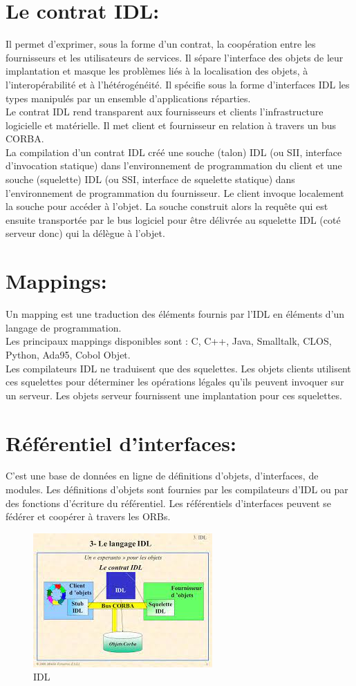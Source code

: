 \section{Le contrat IDL:}
Il permet d'exprimer, sous la forme d'un contrat, la coopération entre les fournisseurs et les utilisateurs de services. Il sépare l'interface des objets de leur implantation et masque les problèmes liés à la localisation des objets, à l'interopérabilité et à l'hétérogénéité. Il spécifie sous la forme d'interfaces IDL les types manipulés par un ensemble d'applications réparties.\\
Le contrat IDL rend transparent aux fournisseurs et clients l'infrastructure logicielle et matérielle. Il met client et fournisseur en relation à travers un bus CORBA.\\
La compilation d'un contrat IDL créé une souche (talon) IDL (ou SII, interface d'invocation statique) dans l'environnement de programmation du client et une souche (squelette) IDL (ou SSI, interface de squelette statique) dans l'environnement de programmation du fournisseur.
Le client invoque localement la souche pour accéder à l'objet. La souche construit alors la requête qui est ensuite transportée par le bus logiciel pour être délivrée au squelette IDL (coté serveur donc) qui la délègue à l'objet.\\

\section{Mappings:}
Un mapping est une traduction des éléments fournis par l'IDL en éléments d'un langage de programmation.\\
Les principaux mappings disponibles sont : C, C++, Java, Smalltalk, CLOS, Python, Ada95, Cobol Objet.\\
Les compilateurs IDL ne traduisent que des squelettes. Les objets clients utilisent ces squelettes pour déterminer les opérations légales qu'ils peuvent invoquer sur un serveur. Les objets serveur fournissent une implantation pour ces squelettes.

\section{Référentiel d'interfaces:}
C'est une base de données en ligne de définitions d'objets, d'interfaces, de modules. Les définitions d'objets sont fournies par les compilateurs d'IDL ou par des fonctions d'écriture du référentiel.
Les référentiels d'interfaces peuvent se fédérer et coopérer à travers les ORBs.


\begin{figure}[h]
        \centering
     \includegraphics[scale= 1]{IDL/3}
        \caption{IDL}
\end{figure}